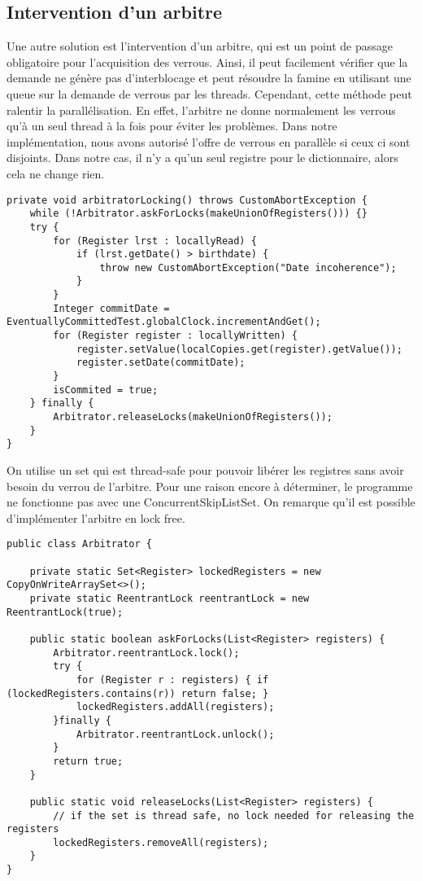 \documentclass[10pt, a4paper]{article}
\begin{document}
\subsection{Intervention d'un arbitre}
Une autre solution est l'intervention d'un arbitre, qui est un point de passage obligatoire pour l'acquisition des verrous. Ainsi, il peut facilement vérifier que la demande ne génère pas d'interblocage et peut résoudre la famine en utilisant une queue sur la demande de verrous par les threads. Cependant, cette méthode peut ralentir la parallélisation. En effet, l'arbitre ne donne normalement les verrous qu'à un seul thread à la fois pour éviter les problèmes. Dans notre implémentation, nous avons autorisé l'offre de verrous en parallèle si ceux ci sont disjoints. Dans notre cas, il n'y a qu'un seul registre pour le dictionnaire, alors cela ne change rien. 

\begin{lstlisting}
private void arbitratorLocking() throws CustomAbortException {
    while (!Arbitrator.askForLocks(makeUnionOfRegisters())) {}
    try {
        for (Register lrst : locallyRead) {
            if (lrst.getDate() > birthdate) {
                throw new CustomAbortException("Date incoherence");
            }
        }
        Integer commitDate = EventuallyCommittedTest.globalClock.incrementAndGet();
        for (Register register : locallyWritten) {
            register.setValue(localCopies.get(register).getValue());
            register.setDate(commitDate);
        }
        isCommited = true;
    } finally {
        Arbitrator.releaseLocks(makeUnionOfRegisters());
    }
}
\end{lstlisting}

On utilise un set qui est thread-safe pour pouvoir libérer les registres sans avoir besoin du verrou de l'arbitre. Pour une raison encore à déterminer, le programme ne fonctionne pas avec une ConcurrentSkipListSet. On remarque qu'il est possible d'implémenter l'arbitre en lock free. 

\begin{lstlisting}
public class Arbitrator {

    private static Set<Register> lockedRegisters = new CopyOnWriteArraySet<>();
    private static ReentrantLock reentrantLock = new ReentrantLock(true);

    public static boolean askForLocks(List<Register> registers) {
        Arbitrator.reentrantLock.lock();
        try {
            for (Register r : registers) { if (lockedRegisters.contains(r)) return false; }
            lockedRegisters.addAll(registers);
        }finally {
            Arbitrator.reentrantLock.unlock();
        }
        return true;
    }

    public static void releaseLocks(List<Register> registers) {
        // if the set is thread safe, no lock needed for releasing the registers
        lockedRegisters.removeAll(registers);
    }
}
\end{lstlisting}



		
\end{document}
